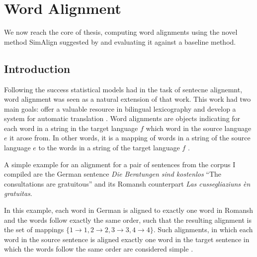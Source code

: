 \chapter{Word Alignment}
We now reach the core of thesis, computing word alignments using the novel method SimAlign suggested by \cite{jalili-sabet-etal-2020-simalign} and evaluating it against a baseline method.

\section{Introduction}
Following the success statistical models had in the task of sentecne alignemnt, word alignment was seen as a natural extension of that work. 
This work had two main goals: offer a valuable resource in bilingual lexicography and develop a system for automatic translation \autocite{brown-etal-1993-mathematics}. Word alignments are objects indicating for each word in a string in the target language \(f\) which word in the source language \(e\) it arose from\autocite{brown-etal-1993-mathematics}. 
In other words, it is a mapping of words in a string of the source language \(e\) to the words in a string of the target language \(f\) \autocite[84]{koehn2009}.

A simple example for an alignment for a pair of sentences from the corpus I compiled are the German sentence \emph{Die Beratungen sind kostenlos} \enquote{The consultations are gratuitous} and its Romansh counterpart \emph{Las cussegliaziuns èn gratuitas}. 


\begin{figure}[h]
\centering

    

\vspace*{1cm}

   
\end{figure}


In this example, each word in German is aligned to exactly one word in Romansh and the words follow exactly the same order, such that the resulting alignment is the set of mappings $\{1\to1, 2\to2,3\to3,4\to4\}$. 
Such alignments, in which each word in the source sentence is aligned exactly one word in the target sentence in which the words follow the same order are considered simple \autocite[85]{koehn2009}.

